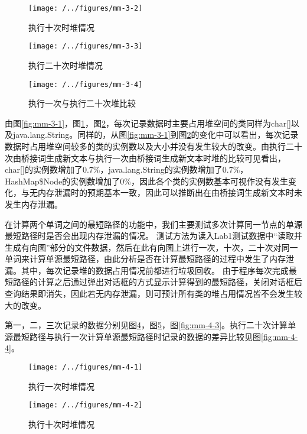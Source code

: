\begin{figure}
\centering
\texttt{[image: /../figures/mm-3-2]}
\caption{执行十次时堆情况}
\label{fig:mm-3-2}
\end{figure}

\begin{figure}
\centering
\texttt{[image: /../figures/mm-3-3]}
\caption{执行二十次时堆情况}
\label{fig:mm-3-3}
\end{figure}

\begin{figure}
\centering
\texttt{[image: /../figures/mm-3-4]}
\caption{执行一次与执行二十次堆比较}
\label{fig:mm-3-4}
\end{figure}

由图\ref{fig:mm-3-1}，图\ref{fig:mm-3-2}，图\ref{fig:mm-3-3}，每次记录数据时主要占用堆空间的类同样为char[]以及java.lang.String。同样的，从图\ref{fig:mm-3-1}到图\ref{fig:mm-3-3}的变化中可以看出，每次记录数据时占用堆空间较多的类的实例数以及大小并没有发生较大的改变。由执行二十次由桥接词生成新文本与执行一次由桥接词生成新文本时堆的比较可见看出，char[]的实例数增加了0.7\%，java.lang.String的实例数增加了0.7\%，HashMap\$Node的实例数增加了0\%，因此各个类的实例数基本可视作没有发生变化，与无内存泄漏时的预期基本一致，因此可以推断出在由桥接词生成新文本时未发生内存泄漏。

在计算两个单词之间的最短路径的功能中，我们主要测试多次计算同一节点的单源最短路径时是否会出现内存泄漏的情况。
测试方法为读入Lab1测试数据中“读取并生成有向图”部分的文件数据，然后在此有向图上进行一次，十次，二十次对同一单词来计算单源最短路径，由此分析是否在计算最短路径的过程中发生了内存泄漏。其中，每次记录堆的数据占用情况前都进行垃圾回收。
由于程序每次完成最短路径的计算之后通过弹出对话框的方式显示计算得到的最短路径，关闭对话框后查询结果即消失，因此若无内存泄漏，则可预计所有类的堆占用情况皆不会发生较大的改变。

第一，二，三次记录的数据分别见图\ref{fig:mm-4-1}，图\ref{fig:mm-4-2}，图\ref{fig:mm-4-3}。执行二十次计算单源最短路径与执行一次计算单源最短路径时记录的数据的差异比较见图\ref{fig:mm-4-4}。

\begin{figure}
\centering
\texttt{[image: /../figures/mm-4-1]}
\caption{执行一次时堆情况}
\label{fig:mm-4-1}
\end{figure}

\begin{figure}
\centering
\texttt{[image: /../figures/mm-4-2]}
\caption{执行十次时堆情况}
\label{fig:mm-4-2}
\end{figure}


